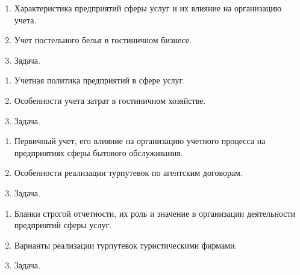 \newpage


\shapkFull
\setcounter{zad}{0}

\begin{enumerate}
	\item Характеристика предприятий сферы услуг и их влияние на организацию учета.

	\item Учет постельного белья в гостиничном бизнесе.

	\item Задача.
\end{enumerate}

\newpage


\shapkFull
\setcounter{zad}{0}

\begin{enumerate}
	\item Учетная политика предприятий в сфере услуг.

	\item Особенности учета затрат в гостиничном хозяйстве.

	\item Задача.
\end{enumerate}

\newpage


\shapkFull
\setcounter{zad}{0}

\begin{enumerate}
	\item Первичный учет, его влияние на организацию учетного процесса на предприятиях сферы бытового обслуживания.

	\item Особенности реализации турпутевок по агентским договорам.

	\item Задача.
\end{enumerate}

\newpage


\shapkFull
\setcounter{zad}{0}

\begin{enumerate}
	\item Бланки строгой отчетности, их роль и значение в организации деятельности предприятий сферы услуг.

	\item Варианты реализации турпутевок туристическими фирмами.

	\item Задача.
\end{enumerate}

